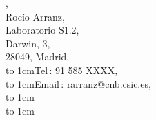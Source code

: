\documentclass[a4paper,spanish]{article}
\def\footnotestyle#1{%
  {\textsf{\color{footnotegray}\fontsize{3mm}{0mm}\selectfont #1}}%
}
\begin{document}
\setlength{\columnsep}{1.5cm}
\begin{multicols}{2}
\noindent\companyname{},\\
Roc\'{i}o Arranz,\\
Laboratorio S1.2,\\
Darwin, 3,\\
28049, Madrid,\\
\hbox to 1cm{Tel\,:\hss} 91 585 XXXX,\\
\hbox to 1cm{Email\,:\hss} rarranz@cnb.csic.es,\\
\hbox to 1cm{}\\
\hbox to 1cm{}\\

\end{multicols}

\end{document}
